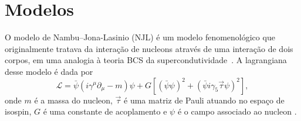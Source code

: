 
\section{Modelos}




O modelo de Nambu--Jona-Lasinio (NJL) é um modelo fenomenológico que originalmente tratava da interação de nucleons através de uma interação de dois corpos, em uma analogia à teoria BCS da supercondutividade~\cite{Buballa}. A lagrangiana desse modelo é dada por
\begin{equation}
	\mathcal{L} = \bar{\psi}(i\gamma^\mu\partial_\mu - m)\psi + G[(\bar{\psi}\psi)^2 + (\bar{\psi}i\gamma_5\vec{\tau}\psi)^2],
\end{equation}
%
onde $m$ é a massa do nucleon, $\vec{\tau}$ é uma matriz de Pauli atuando no espaço de isospin, $G$ é uma constante de acoplamento e $\psi$ é o campo associado ao nucleon \cite{Buballa}.

